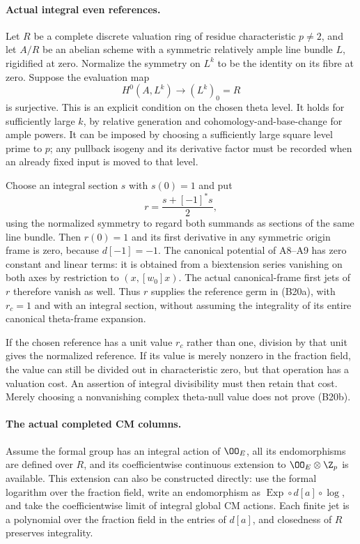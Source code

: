 \paragraph{Actual integral even references.}
Let $R$ be a complete discrete valuation ring of residue
characteristic $p\ne2$, and let $A/R$ be an abelian scheme
with a symmetric relatively ample line bundle $L$, rigidified
at zero.  Normalize the symmetry on $L^k$ to be the identity
on its fibre at zero.  Suppose the evaluation map
\[
                  H^0(A,L^k)\longrightarrow (L^k)_0=R
 \tag{B20b}
\]
is surjective.  This is an explicit condition on the chosen
theta level.  It holds for sufficiently large $k$, by relative
generation and cohomology-and-base-change for ample powers.
It can be imposed by choosing a sufficiently large square
level prime to $p$; any pullback isogeny and its derivative
factor must be recorded when an already fixed input is moved
to that level.

Choose an integral section $s$ with $s(0)=1$ and put
\[
                        r=\frac{s+[-1]^*s}{2},
\]
using the normalized symmetry to regard both summands as
sections of the same line bundle.  Then $r(0)=1$ and its
first derivative in any symmetric origin frame is zero,
because $d[-1]=-1$.  The canonical potential of A8--A9 has
zero constant and linear terms: it is obtained from a
biextension series vanishing on both axes by restriction
to $(x,[w_0]x)$.  The actual canonical-frame first jets of
$r$ therefore vanish as well.  Thus $r$ supplies the reference
germ in (B20a), with $r_c=1$ and with an integral section,
without assuming the integrality of its entire canonical
theta-frame expansion.

If the chosen reference has a unit value $r_c$ rather than one,
division by that unit gives the normalized reference.  If its
value is merely nonzero in the fraction field, the value can
still be divided out in characteristic zero, but that operation
has a valuation cost.  An assertion of integral divisibility
must then retain that cost.  Merely choosing a nonvanishing
complex theta-null value does not prove (B20b).

\paragraph{The actual completed CM columns.}
Assume the formal group has an integral action of $\OO_E$,
all its endomorphisms are defined over $R$, and its coefficientwise
continuous extension to $\OO_E\otimes\Z_p$ is available.
This extension can also be constructed directly: use the formal
logarithm over the fraction field, write an endomorphism as
$\operatorname{Exp}\circ d[a]\circ\log$, and take the
coefficientwise limit of integral global CM actions.  Each finite
jet is a polynomial over the fraction field in the entries of
$d[a]$, and closedness of $R$ preserves integrality.

